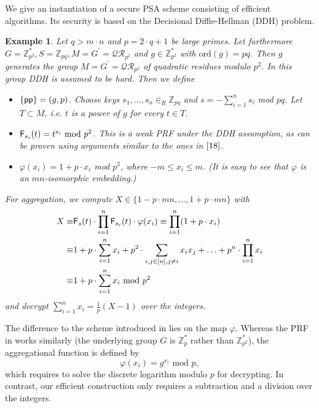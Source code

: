 \documentclass[10pt]{extarticle}
\newtheorem{Exm}{Example}
\begin{document}
We give an instantiation of a secure PSA scheme consisting of efficient algorithms. Its security is based on the Decisional Diffie-Hellman (DDH) problem.

\begin{Exm}\label{DDHEXM} Let $q>m\cdot n$ and $p=2\cdot q+1$ be large primes. Let furthermore $G=\mathbb{Z}_{p^2}^*, S=\mathbb{Z}_{pq}, M=G^\prime=\mathcal{QR}_{p^2}$ and $g\in\mathbb{Z}_{p^2}^*$ with $\text{ord}(g)=pq$. Then $g$ generates the group $M=G^\prime=\mathcal{QR}_{p^2}$ of quadratic residues modulo $p^2$. In this group DDH is assumed to be hard. Then we define 
\begin{itemize}
\item $\{\mbox{\upshape\sffamily pp}\}=(g,p)$. Choose keys $s_1,\ldots,s_n\in_R\mathbb{Z}_{pq}$ and $s=-\sum_{i=1}^n s_i$ mod $pq$. Let $T\subset M$, i.e. $t$ is a power of $g$ for every $t\in T$.
\item $\text{\upshape\sffamily F}_{s_i}(t)=t^{s_i}\mbox{ mod } p^2$. This is a weak PRF under the DDH assumption, as can be proven using arguments similar to the ones in $\cite{18}$. \item $\varphi(x_i)=1+p\cdot x_i$ mod $p^2$, where $-m\leq x_i\leq m$. (It is easy to see that $\varphi$ is an $mn$-isomorphic embedding.)
\end{itemize}

\noindent For aggregation, we compute $X\in\{1-p\cdot mn,\ldots,1+p\cdot mn\}$ with
\begin{align*} X\equiv & \text{\upshape\sffamily F}_{s}(t)\cdot\prod_{i=1}^n \text{\upshape\sffamily F}_{s_i}(t)\cdot\varphi(x_i)\equiv\prod_{i=1}^n (1+p\cdot x_i)\\
 \equiv & 1+p\cdot\sum_{i=1}^n x_i+p^2\cdot\sum_{i,j\in[n],j\neq i} x_i x_j+\ldots+p^n\cdot\prod_{i=1}^n x_i\\
 \equiv & 1+p\cdot\sum_{i=1}^n x_i\mbox{ mod } p^2
\end{align*}
and decrypt $\sum_{i=1}^n x_i=\frac{1}{p}(X-1)$ over the integers.
\end{Exm}

The difference to the scheme introduced in \cite{2} lies on the map $\varphi$. Whereas the PRF in \cite{2} works similarly (the underlying group $G$ is $\mathbb{Z}_p^*$ rather than $\mathbb{Z}_{p^2}^*$), the aggregational function is defined by
\[\varphi(x_i)=g^{x_i}\mbox{ mod } p,\]
which requires to solve the discrete logarithm modulo $p$ for decrypting. In contrast, our efficient construction only requires a subtraction and a division over the integers.
\end{document}
